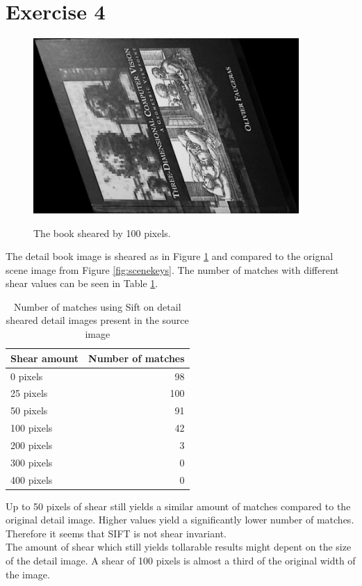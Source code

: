\documentclass[11pt,a4paper]{article}
\begin{document}
\section*{Exercise 4}
\begin{figure}
\centering
    \includegraphics[width=0.9\textwidth]{./img/book-shear-100.png} \\
\caption{The book sheared by 100 pixels.}
\label{fig:sheared}
\end{figure}

The detail book image is sheared as in Figure \ref{fig:sheared} and compared to the orignal scene image from Figure \ref{fig:scenekeys}.
The number of matches with different shear values can be seen in Table \ref{tab:sheared}.
\begin{table}[H]
	\centering
	\begin{tabular}{l|r}
		Shear amount  & Number of matches\\
		\hline
		0 pixels & 98\\
		25 pixels & 100\\
		50 pixels & 91\\
		100 pixels & 42\\
		200 pixels & 3\\
		300 pixels & 0\\
		400 pixels & 0
	\end{tabular}
	\caption{Number of matches using Sift on detail sheared detail images present in the source image}
	\label{tab:sheared}
\end{table}
\noindent Up to 50 pixels of shear still yields a similar amount of matches compared to the original detail image.
Higher values yield a significantly lower number of matches. Therefore it seems that SIFT is not shear invariant.\\

\noindent The amount of shear which still yields tollarable results might depent on the size of the detail image. A shear of 100 pixels is almost a third of the original width of the image.
\end{document}
